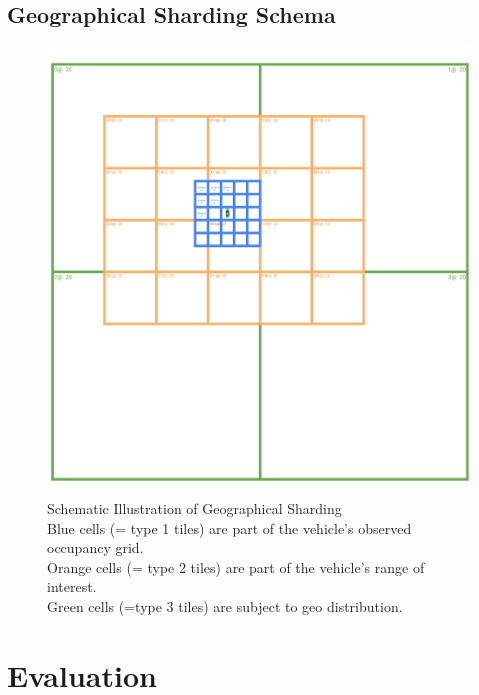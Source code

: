 \subsection{Geographical Sharding Schema}
\label{subsec:appendix:texts:concept_design:geographical_partitioning_schema}
\begin{figure}[H]
	\centering
	\includegraphics[width=0.9\linewidth]{98_images/geo_subscription_schema}
	\caption[Schematic Illustration of Geographical Sharding]{Schematic Illustration of Geographical Sharding \\ Blue cells (= type 1 tiles) are part of the vehicle's observed occupancy grid. \\ Orange cells (= type 2 tiles) are part of the vehicle's range of interest. \\ Green cells (=type 3 tiles) are subject to geo distribution.}
	\label{fig:geo_distribution_schema}
\end{figure}

\section{Evaluation}
\label{sec:appendix:texts:evaluation}

